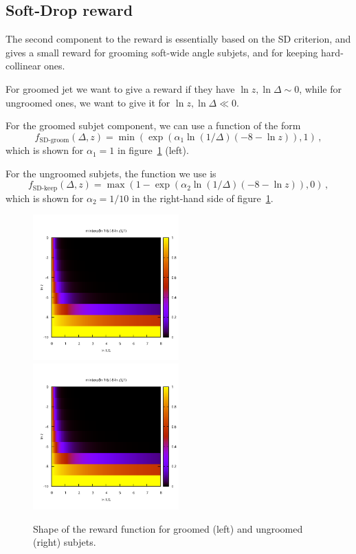\documentclass[12pt,twoside]{article}
\begin{document}
\subsection{Soft-Drop reward}
The second component to the reward is essentially based on the SD
criterion, and gives a small reward for grooming soft-wide angle
subjets, and for keeping hard-collinear ones.

For groomed jet we want to give a reward if they have
$\ln z,\ln\Delta\sim 0$, while for ungroomed ones, we want to give it
for $\ln z,\ln\Delta \ll 0$.

For the groomed subjet component, we can use a function of the form
\begin{equation}
  \label{eq:groom-rew}
  f_{\text{SD-groom}}(\Delta, z) =
  \min(\exp(\alpha_ 1 \ln(1/\Delta) (-8-\ln z)),1)\,,
\end{equation}
which is shown for $\alpha_1=1$ in figure~\ref{fig:SD-reward-shape}
(left).

For the ungroomed subjets, the function we use is
\begin{equation}
  \label{eq:keep-rew}
  f_{\text{SD-keep}}(\Delta, z) =
  \max(1 - \exp(\alpha_2 \ln(1/\Delta)(-8-\ln z)),0)\,,
\end{equation}
which is shown for $\alpha_2=1/10$ in the right-hand side of
figure~\ref{fig:SD-reward-shape}.

\begin{figure}
  \centering
  \includegraphics[width=0.5\textwidth,page=1]{SD-reward-test}%
  \includegraphics[width=0.5\textwidth,page=2]{SD-reward-test}%
  \caption{Shape of the reward function for groomed (left) and ungroomed (right) subjets.}
  \label{fig:SD-reward-shape}
\end{figure}
\end{document}
